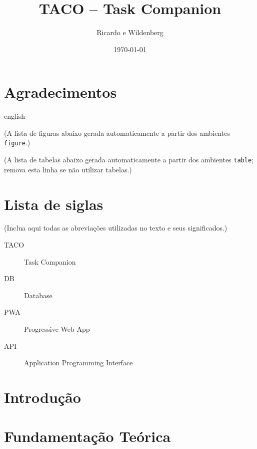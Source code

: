 \documentclass[12pt,openright,twoside,a4paper]{abntex2}
\title{TACO -- Task Companion}
\author{Ricardo e Wildenberg}
\date{\today}
\begin{document}
\imprimircapa

\imprimirfolhaderosto

\begin{folhadeaprovacao}
\end{folhadeaprovacao}

\chapter*{Agradecimentos}
\lipsum[1]

\begin{resumo}

\end{resumo}

\begin{otherlanguage*}{english}
\begin{abstract}

\end{abstract}
\end{otherlanguage*}

(A lista de figuras abaixo \e gerada automaticamente a partir dos ambientes \texttt{figure}.)
\listoffigures
(A lista de tabelas abaixo \e gerada automaticamente a partir dos ambientes \texttt{table}; remova esta linha se n\~ao utilizar tabelas.)
\listoftables
\chapter*{Lista de siglas}
(Inclua aqui todas as abrevia\c{c}\~oes utilizadas no texto e seus significados.)
\begin{description}
  \item[TACO] Task Companion
  \item[DB] Database
  \item[PWA] Progressive Web App
  \item[API] Application Programming Interface
\end{description}

\tableofcontents

\chapter{Introdução}


\chapter{Fundamentação Teórica}

\end{document}
